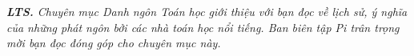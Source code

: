 \thispagestyle{quantoannone}
\pagestyle{quantoan}
\everymath{\color{quantoan}}
\graphicspath{{../quantoan/pic/}}
\begingroup
{}
\centering
\endgroup

\vspace*{218pt}
\textit{\textbf{\color{quantoan}LTS.} Chuyên mục Danh ngôn Toán học giới thiệu với bạn đọc về lịch sử, ý nghĩa của những phát ngôn bởi các nhà toán học nổi tiếng. Ban biên tập Pi trân trọng mời bạn đọc đóng góp cho chuyên mục này.}

